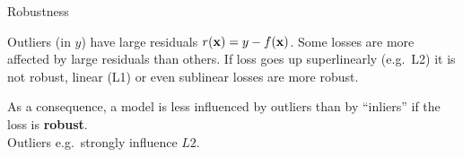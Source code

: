 \documentclass[11pt,compress,t,notes=noshow, xcolor=table]{beamer}
\begin{document}
\begin{frame2}[small]{Robustness}

Outliers (in $y$) have large residuals $r(\mathbf{x}) = y - f(\mathbf{x})$. Some losses are more
affected by large residuals than others. If loss goes up superlinearly (e.g.\ L2) it is not robust, linear (L1) or even sublinear losses are more robust.

\vfill

%
{
  As a consequence, a model is less influenced by outliers than by ``inliers'' if 
  the loss is \textbf{robust}.\\
  Outliers e.g.\ strongly influence $L2$.
}%

\vfill


% 
% 
% 
% 

\end{frame2}

\end{document}
